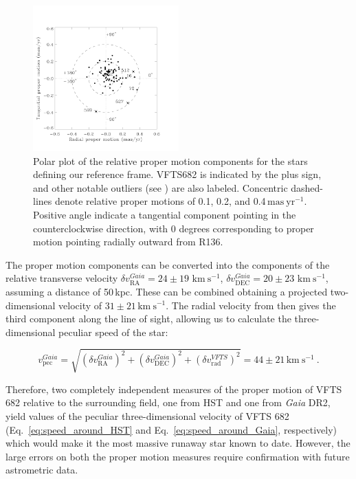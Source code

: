 \documentclass[apjl,twocolumn]{emulateapj}
\newcommand{\kms}{{\,\mathrm{km\ s^{-1}}}}
\DeclareRobustCommand{\Eqref}[1]{Eq.~\ref{#1}}
\begin{document}
\begin{figure}[htbp]
  \centering
  \includegraphics[width=0.5\textwidth]{figures/figure_polar_682-1.pdf}
  \caption{Polar plot of the relative proper motion components for the stars
    defining our reference frame. VFTS682 is indicated by the plus sign, and
    other notable outliers (see \citet{lennon:18}) are also labeled. Concentric dashed-lines denote relative proper motions of
    0.1, 0.2, and 0.4$\,\mathrm{mas\ yr^{-1}}$. Positive angle
    indicate a tangential component pointing in the counterclockwise
    direction, with 0 degrees corresponding to proper motion pointing
    radially outward from R136.
  }
  \label{fig:pm_polar}
\end{figure}



The proper motion components can be converted into
the components of the relative transverse velocity $\delta v_\mathrm{RA}^{Gaia}=24\pm19\,\kms$,
$\delta v_\mathrm{DEC}^{Gaia}=20\pm23\,\kms$, assuming a distance of
50\,kpc. These can be combined obtaining a projected two-dimensional
velocity of $31\pm21\kms$. %
The radial velocity from
\cite{bestenlehner:11} then gives the third component along
the line of sight, allowing us to calculate the three-dimensional
peculiar speed of the star:

\begin{equation}
  \label{eq:speed_around_Gaia}
  v_\mathrm{pec}^{Gaia} = \sqrt{\left(\delta v_\mathrm{RA}^{Gaia}\right)^2
    +\left(\delta v_\mathrm{DEC}^{Gaia}\right)^2+\left(\delta
      v_\mathrm{rad}^{VFTS}\right)^2} = 44 \pm 21
  \kms \ .
\end{equation}

Therefore, two completely independent measures of the proper motion of
VFTS 682 relative to the surrounding field, one from HST and one from
\emph{Gaia} DR2, yield values of the peculiar three-dimensional
velocity of VFTS 682 (\Eqref{eq:speed_around_HST} and
\Eqref{eq:speed_around_Gaia}, respectively) which would make it the most massive runaway star
known to date. However, the large errors on both the proper motion measures
require confirmation with future astrometric data. 
\end{document}
